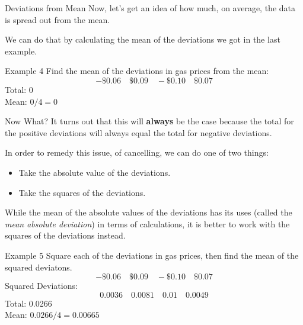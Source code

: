 \documentclass[t]{beamer}
\begin{document}
\begin{frame}{Deviations from Mean}
Now, let's get an idea of how much, on average, the data is spread out from the mean.	\newline\\	\pause

We can do that by calculating the mean of the deviations we got in the last example.
\end{frame}

\begin{frame}{Example 4}
Find the mean of the deviations in gas prices from the mean:
\[-\$0.06 \quad \$0.09 \quad -\$0.10 \quad \$0.07\]
\pause
Total: 0	\newline\\	\pause
Mean: $0 / 4 = 0$
\end{frame}

\begin{frame}{Now What?}
It turns out that this will {\color{blue}\textbf{always}} be the case because the total for the positive deviations will always equal the total for negative deviations.	\newline\\	\pause

In order to remedy this issue, of cancelling, we can do one of two things:	\newline\\	\pause

\begin{itemize}
	\item Take the absolute value of the deviations. \newline\\ \pause
	\item Take the squares of the deviations. \newline\\ \pause
\end{itemize}

While the mean of the absolute values of the deviations has its uses (called the \textit{mean absolute deviation}) in terms of calculations, it is better to work with the squares of the deviations instead.
\end{frame}

\begin{frame}{Example 5}
Square each of the deviations in gas prices, then find the mean of the squared deviatons.	\newline\\
\[-\$0.06 \quad \$0.09 \quad -\$0.10 \quad \$0.07	\]	\pause
Squared Deviations:
\[0.0036	\quad 0.0081 \quad 0.01 \quad 0.0049	\]
\pause
Total: 0.0266	\newline\\	\pause
Mean: $0.0266 / 4 = 0.00665$
\end{frame}
\end{document}
